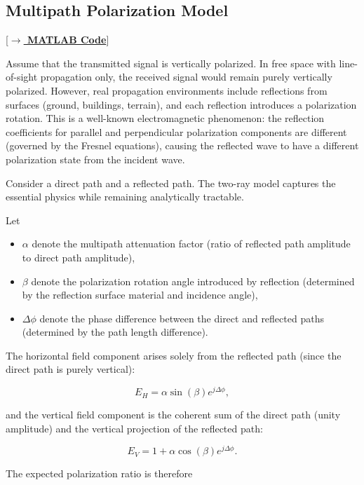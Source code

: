 \documentclass{article}
\begin{document}
\subsection{Multipath Polarization Model} [\hyperref[lst:polmanifold]{\textbf{$\rightarrow$ MATLAB Code}}]

Assume that the transmitted signal is vertically polarized. In free space with line-of-sight propagation only, the received signal would remain purely vertically polarized. However, real propagation environments include reflections from surfaces (ground, buildings, terrain), and each reflection introduces a polarization rotation. This is a well-known electromagnetic phenomenon: the reflection coefficients for parallel and perpendicular polarization components are different (governed by the Fresnel equations), causing the reflected wave to have a different polarization state from the incident wave.

Consider a direct path and a reflected path. The two-ray model captures the essential physics while remaining analytically tractable.

Let

\begin{itemize}
\item $\alpha$ denote the multipath attenuation factor (ratio of reflected path amplitude to direct path amplitude),
\item $\beta$ denote the polarization rotation angle introduced by reflection (determined by the reflection surface material and incidence angle),
\item $\Delta\phi$ denote the phase difference between the direct and reflected paths (determined by the path length difference).
\end{itemize}

The horizontal field component arises solely from the reflected path (since the direct path is purely vertical):

\begin{equation}
E_H=
\alpha \sin(\beta)e^{j\Delta\phi},
\end{equation}

and the vertical field component is the coherent sum of the direct path (unity amplitude) and the vertical projection of the reflected path:

\begin{equation}
E_V=
1+\alpha \cos(\beta)e^{j\Delta\phi}.
\end{equation}

The expected polarization ratio is therefore
\end{document}
